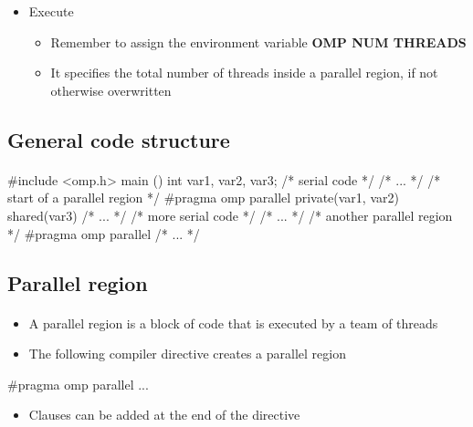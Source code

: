 \documentclass[%
twoside,                 %
final,                   %
10pt]{article}
\begin{document}
{\begin{itemize}
\item Execute
\begin{itemize}

  \item Remember to assign the environment variable \textbf{OMP NUM THREADS}

  \item It specifies the total number of threads inside a parallel region, if not otherwise overwritten
\end{itemize}

\noindent
\end{itemize}

\noindent



\subsection{General code structure}

\paragraph{}
\bcppcod
#include <omp.h>
main ()
{
int var1, var2, var3;
/* serial code */
/* ... */
/* start of a parallel region */
#pragma omp parallel private(var1, var2) shared(var3)
{
/* ... */
}
/* more serial code */
/* ... */
/* another parallel region */
#pragma omp parallel
{
/* ... */
}
}
\ecppcod



\subsection{Parallel region}

\paragraph{}
\begin{itemize}
\item A parallel region is a block of code that is executed by a team of threads

\item The following compiler directive creates a parallel region
\end{itemize}

\noindent
\bcppcod
#pragma omp parallel { ... }
\ecppcod
\begin{itemize}
\item Clauses can be added at the end of the directive


\end{itemize}}
\end{document}
